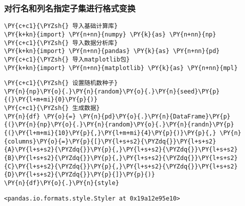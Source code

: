     \hypertarget{ux5bf9ux884cux540dux548cux5217ux540dux6307ux5b9aux5b50ux96c6ux8fdbux884cux683cux5f0fux53d8ux6362}{%
\subsubsection{对行名和列名指定子集进行格式变换}\label{ux5bf9ux884cux540dux548cux5217ux540dux6307ux5b9aux5b50ux96c6ux8fdbux884cux683cux5f0fux53d8ux6362}}

    \begin{tcolorbox}[breakable, size=fbox, boxrule=1pt, pad at break*=1mm,colback=cellbackground, colframe=cellborder]
\begin{Verbatim}[commandchars=\\\{\}]
\PY{c+c1}{\PYZsh{} 导入基础计算库}
\PY{k+kn}{import} \PY{n+nn}{numpy} \PY{k}{as} \PY{n+nn}{np}
\PY{c+c1}{\PYZsh{} 导入数据分析库}
\PY{k+kn}{import} \PY{n+nn}{pandas} \PY{k}{as} \PY{n+nn}{pd}
\PY{c+c1}{\PYZsh{} 导入matplotlib包}
\PY{k+kn}{import} \PY{n+nn}{matplotlib} \PY{k}{as} \PY{n+nn}{mpl}
\end{Verbatim}
\end{tcolorbox}

    \begin{tcolorbox}[breakable, size=fbox, boxrule=1pt, pad at break*=1mm,colback=cellbackground, colframe=cellborder]
\begin{Verbatim}[commandchars=\\\{\}]
\PY{c+c1}{\PYZsh{} 设置随机数种子}
\PY{n}{np}\PY{o}{.}\PY{n}{random}\PY{o}{.}\PY{n}{seed}\PY{p}{(}\PY{l+m+mi}{0}\PY{p}{)}
\PY{c+c1}{\PYZsh{} 生成数据}
\PY{n}{df} \PY{o}{=} \PY{n}{pd}\PY{o}{.}\PY{n}{DataFrame}\PY{p}{(}\PY{n}{np}\PY{o}{.}\PY{n}{random}\PY{o}{.}\PY{n}{randn}\PY{p}{(}\PY{l+m+mi}{10}\PY{p}{,}\PY{l+m+mi}{4}\PY{p}{)}\PY{p}{,} \PY{n}{columns}\PY{o}{=}\PY{p}{[}\PY{l+s+s2}{\PYZdq{}}\PY{l+s+s2}{A}\PY{l+s+s2}{\PYZdq{}}\PY{p}{,}\PY{l+s+s2}{\PYZdq{}}\PY{l+s+s2}{B}\PY{l+s+s2}{\PYZdq{}}\PY{p}{,}\PY{l+s+s2}{\PYZdq{}}\PY{l+s+s2}{C}\PY{l+s+s2}{\PYZdq{}}\PY{p}{,}\PY{l+s+s2}{\PYZdq{}}\PY{l+s+s2}{D}\PY{l+s+s2}{\PYZdq{}}\PY{p}{]}\PY{p}{)}
\PY{n}{df}\PY{o}{.}\PY{n}{style}
\end{Verbatim}
\end{tcolorbox}

            \begin{tcolorbox}[breakable, size=fbox, boxrule=.5pt, pad at break*=1mm, opacityfill=0]
\begin{Verbatim}[commandchars=\\\{\}]
<pandas.io.formats.style.Styler at 0x19a12e95e10>
\end{Verbatim}
\end{tcolorbox}
        
